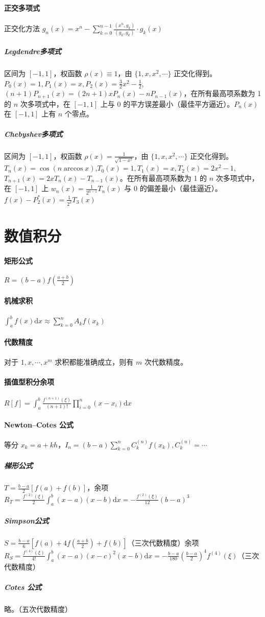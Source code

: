 \documentclass[twocolumn]{ctexart}
\def\dd{\mathrm{d}}
\begin{document}
\paragraph{正交多项式} 正交化方法 $g_n(x)=x^n-\sum_{k=0}^{n-1}\frac{(x^n,g_k)}{(g_k,g_k)}\cdot g_k(x)$
\subparagraph{Legdendre多项式} 区间为 $[-1,1]$，权函数 $\rho(x)\equiv 1$，由 $\{1,x,x^2,\cdots\}$ 正交化得到。$P_0(x)=1,P_1(x)=x,P_2(x)=\frac{3}{2}x^2-\frac{1}{2}$,$(n+1)P_{n+1}(x)=(2n+1)xP_n(x)-nP_{n-1}(x)$，在所有最高项系数为 1 的 $n$ 次多项式中，在 $[-1,1]$ 上与 0 的平方误差最小（最佳平方逼近）。$P_n(x)$ 在 $[-1,1]$ 上有 $n$ 个零点。
\subparagraph{Chebyshev多项式} 区间为 $[-1,1]$，权函数 $\rho(x)=\frac{1}{\sqrt{1-x^2}}$，由 $\{1,x,x^2,\cdots\}$ 正交化得到。$T_n(x)=\cos(n\arccos x)$,$T_0(x)=1,T_1(x)=x,T_2(x)=2x^2-1$,$T_{n+1}(x)=2xT_n(x)-T_{n-1}(x)$。在所有最高项系数为 1 的 $n$ 次多项式中，在 $[-1,1]$ 上 $w_n(x)=\frac{1}{2^{n-1}}T_n(x)$ 与 0 的偏差最小（最佳逼近）。$f(x)-P_2^*(x)=\frac{1}{2^2}T_3(x)$


\section{数值积分}

\paragraph{矩形公式} $R=(b-a)f\left(\frac{a+b}{2}\right)$
\paragraph{机械求积} $\int_{a}^b f(x)\dd x\approx \sum_{k=0}^nA_kf(x_k)$
\paragraph{代数精度} 对于 $1,x,\cdots,x^m$ 求积都能准确成立，则有 $m$ 次代数精度。
\paragraph{插值型积分余项} $R[f]=\int_a^b\frac{f^{(n+1)}(\xi)}{(n+1)!}\prod_{i=0}^n(x-x_i)\dd x$

\paragraph{Newton--Cotes 公式} 等分 $x_k=a+kh$，$I_n=(b-a)\sum_{k=0}^n C_k^{(n)}f(x_k),C_k^{(n)}=\cdots$
\subparagraph{梯形公式} $T=\frac{b-a}{2}[f(a)+f(b)]$，余项 $R_T=\frac{f^{(2)}(\xi)}{2}\int_a^b (x-a)(x-b)\dd x=-\frac{f^{(2)}(\xi)}{12}(b-a)^3$
\subparagraph{Simpson公式} $S=\frac{b-a}{6}[f(a)+4f\left(\frac{a+b}{2}\right)+f(b)]$（三次代数精度）余项 $R_S=\frac{f^{(4)}(\xi)}{4!}\int_a^b (x-a)(x-c)^2(x-b)\dd x=-\frac{b-a}{180}\left(\frac{b-a}{2}\right)^4f^{(4)}(\xi)$（三次代数精度）
\subparagraph{Cotes 公式} 略。（五次代数精度）
\end{document}

